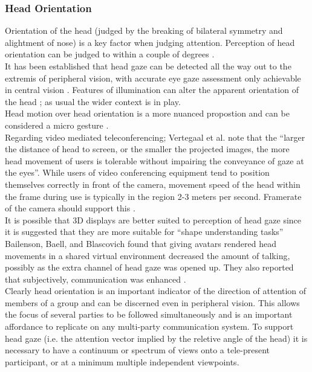 \subsubsection{Head Orientation}
Orientation of the head (judged by the breaking of bilateral symmetry and alightment of nose) is a key factor when judging attention. Perception of head orientation can be judged to within a couple of degrees \cite{Wilson2000}.\\
It has been established that head gaze can be detected all the way out to the extremis of peripheral vision, with accurate eye gaze assessment only achievable in central vision \cite{Loomis2008}. Features of illumination can alter the apparent orientation of the head \cite{Troje1998}; as usual the wider context is in play.\\
Head motion over head orientation is a more nuanced propostion and can be considered a micro gesture \cite{Boker2011}.\\
Regarding video mediated teleconferencing;  Vertegaal  et al. \cite{Vertegaal00effectsof} note that  the ``larger the distance of head to screen, or the smaller the projected images, the more head movement of users is tolerable without impairing the conveyance of gaze at the eyes''. While users of video conferencing equipment tend to position themselves correctly in front of the camera, movement speed of the head within the frame during use is typically in the region 2-3 meters per second. Framerate of the camera should support this \cite{Bocker1996}.\\
                    It is possible that 3D displays are better suited to perception of head gaze since it is suggested that they are more suitable for ``shape understanding tasks'' \cite{john2001use}\\
                    Bailenson, Baell, and Blascovich found that giving avatars rendered head movements in a shared virtual environment decreased the amount of talking, possibly as the extra channel of head gaze was opened up. They also reported that subjectively, communication was enhanced \cite{Bailenson2002}. \\
                    Clearly head orientation is an important indicator of the direction of attention of members of a group and can be discerned even in peripheral vision. This allows the focus of several parties to be followed simultaneously and is an important affordance to replicate on any multi-party communication system. To support head gaze (i.e. the attention vector implied by the reletive angle of the head) it is necessary to have a continuum or spectrum of views onto a tele-present participant, or at a minimum multiple independent viewpoints.\\
